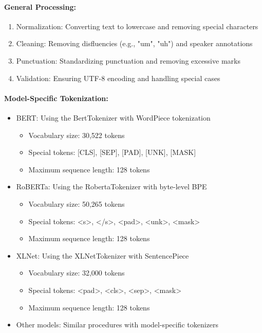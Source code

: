 \documentclass[12pt]{article}
\begin{document}
\paragraph{General Processing:}
\begin{enumerate}
    \item Normalization: Converting text to lowercase and removing special characters
    \item Cleaning: Removing disfluencies (e.g., "um", "uh") and speaker annotations
    \item Punctuation: Standardizing punctuation and removing excessive marks
    \item Validation: Ensuring UTF-8 encoding and handling special cases
\end{enumerate}

\paragraph{Model-Specific Tokenization:}
\begin{itemize}
    \item BERT: Using the BertTokenizer with WordPiece tokenization
    \begin{itemize}
        \item Vocabulary size: 30,522 tokens
        \item Special tokens: [CLS], [SEP], [PAD], [UNK], [MASK]
        \item Maximum sequence length: 128 tokens
    \end{itemize}
    
    \item RoBERTa: Using the RobertaTokenizer with byte-level BPE
    \begin{itemize}
        \item Vocabulary size: 50,265 tokens
        \item Special tokens: <s>, </s>, <pad>, <unk>, <mask>
        \item Maximum sequence length: 128 tokens
    \end{itemize}
    
    \item XLNet: Using the XLNetTokenizer with SentencePiece
    \begin{itemize}
        \item Vocabulary size: 32,000 tokens
        \item Special tokens: <pad>, <cls>, <sep>, <mask>
        \item Maximum sequence length: 128 tokens
    \end{itemize}
    
    \item Other models: Similar procedures with model-specific tokenizers
\end{itemize}
\end{document}
